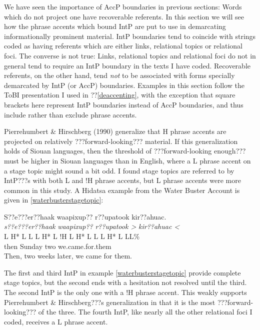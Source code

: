 \documentclass[output=paper]{LSP/langsci}
\begin{document}
	We have seen the importance of AccP boundaries in previous sections: Words which do not project one have recoverable referents. In this section we will see how the phrase accents which bound IntP are put to use in demarcating informationally prominent material. IntP boundaries tend to coincide with strings coded as having referents which are either links, relational topics or relational foci. The converse is not true: Links, relational topics and relational foci do not in general tend to require an IntP boundary in the texts I have coded. Recoverable referents, on the other hand, tend \emph{not} to be associated with forms specially demarcated by IntP (or AccP) boundaries. Examples in this section follow the ToBI presentation I used in ??\ref{deaccenting}, with the exception that square brackets here represent IntP boundaries instead of AccP boundaries, and thus include rather than exclude phrase accents.
	
	Pierrehumbert \& Hirschberg (1990) generalize that H phrase accents are projected on relatively ???forward-looking??? material. If this generalization holds of Siouan languages, then the threshold of ???forward-looking enough??? must be higher in Siouan languages than in English, where a L phrase accent on a stage topic might sound a bit odd. I found stage topics are referred to by IntP???s with both L and !H phrase accents, but L phrase accents were more common in this study. A Hidatsa example from the Water Buster Account is given in \ref{waterbusterstagetopic}:
	
\ea\label{waterbusterstagetopic}
S??e???er??haak waapixup?? r??upatook kir??ahuac.\footnotemark\\
\glll	\emph{s??e???er??haak}		\emph{waapixup??}		\emph{r??upatook >	}	\emph{kir??ahuac <}\\
	{\ob L H* L L\cb}		{\ob L H* L !H\cb}		{\ob L H* L L\cb}		{\ob L H* L L\cb{}L\%}\\
	then				Sunday			two				we.came.for.them\\
\glt	Then, two weeks later, we came for them.
\z

The first and third IntP in example \ref{waterbusterstagetopic} provide complete stage topics, but the second ends with a hesitation not resolved until the third. The second IntP is the only one with a !H phrase accent. This weakly supports Pierrehumbert \& Hirschberg???s generalization in that it is the most ???forward-looking??? of the three. The fourth IntP, like nearly all the other relational foci I coded, receives a L phrase accent.
\end{document}
